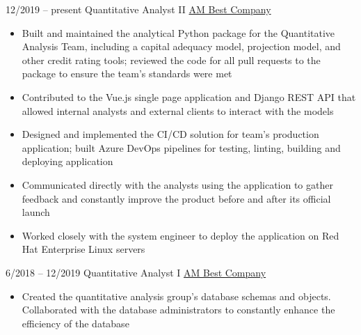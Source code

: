 \documentclass[9pt]{developercv} %
\begin{document}
\vspace{0.25cm}

\vspace{-6pt}

\begin{entrylist}
	\vspace{-14pt}
	\entry
		{\small12/2019 -- present}
		{Quantitative Analyst II}
		{\href{http://www.ambest.com/home/default.aspx}{AM Best Company}}
		{\vspace{-18pt}
			\begin{itemize}[leftmargin=*]
				\setlength{\itemsep}{0pt}
				\setlength{\parskip}{0pt}
				\setlength{\parsep}{0pt}
				\item Built and maintained the analytical Python package for the Quantitative Analysis Team, including a capital adequacy model, projection model, and other credit rating tools; reviewed the code for all pull requests to the package to ensure the team's standards were met
				\item Contributed to the Vue.js single page application and Django REST API that allowed internal analysts and external clients to interact with the models
				\item Designed and implemented the CI/CD solution for team's production application; built Azure DevOps pipelines for testing, linting, building and deploying application
				\item Communicated directly with the analysts using the application to gather feedback and constantly improve the product before and after its official launch
				\item Worked closely with the system engineer to deploy the application on Red Hat Enterprise Linux servers
		\end{itemize}
	\vspace{10pt}}
	\entry
		{\small6/2018 -- 12/2019}
		{Quantitative Analyst I}
		{\href{http://www.ambest.com/home/default.aspx}{AM Best Company}}
		{\vspace{-18pt}
		\begin{itemize}[leftmargin=*]
				\setlength{\itemsep}{0pt}
				\setlength{\parskip}{0pt}
				\setlength{\parsep}{0pt}
				\item Created the quantitative analysis group's database schemas and objects. Collaborated with the database administrators to constantly enhance the efficiency of the database

\end{itemize}}
\end{entrylist}
\end{document}
